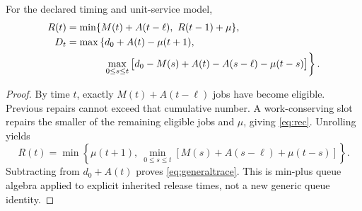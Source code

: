 \begin{lemma}
\label{lem:rec}
For the declared timing and unit-service model,
\begin{align}
R(t)&=\min\{M(t)+A(t-\ell),\ R(t-1)+\mu\},\label{eq:rec}\\
D_t&=\max\left\{d_0+A(t)-\mu(t+1),\right.\nonumber\\
&\hspace{1.3cm}\left.\max_{0\le s\le t}\big[d_0-M(s)+A(t)-A(s-\ell)-\mu(t-s)\big]\right\}.
\label{eq:generaltrace}
\end{align}
\end{lemma}
\begin{proof}
By time $t$, exactly $M(t)+A(t-\ell)$ jobs have become eligible. Previous repairs cannot exceed that cumulative number. A work-conserving slot repairs the smaller of the remaining eligible jobs and $\mu$, giving \cref{eq:rec}. Unrolling yields
\[
R(t)=\min\left\{\mu(t+1),\ \min_{0\le s\le t}[M(s)+A(s-\ell)+\mu(t-s)]\right\}.
\]
Subtracting from $d_0+A(t)$ proves \cref{eq:generaltrace}. This is min-plus queue algebra applied to explicit inherited release times, not a new generic queue identity.
\end{proof}

